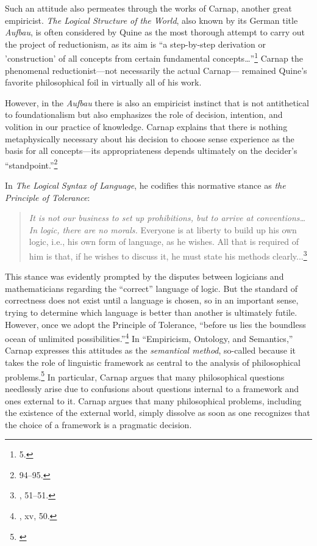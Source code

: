 Such an attitude also permeates through the works of Carnap, another
great empiricist. \emph{The Logical Structure of the World}, also known
by its German title \emph{Aufbau}, is often considered by Quine as the
most thorough attempt to carry out the project of reductionism, as its
aim is ``a step-by-step derivation or 'construction' of all concepts
from certain fundamental concepts\ldots{}''\footnote{\cite{aufbau} 5.}
Carnap the phenomenal reductionist---not necessarily the actual Carnap--- remained Quine's favorite philosophical
foil in virtually all of his work.

However, in the \emph{Aufbau} there is also an empiricist instinct that
is not antithetical to foundationalism but also emphasizes the role of
decision, intention, and volition in our practice of knowledge. Carnap explains that there
is nothing metaphysically necessary about his decision to choose sense experience as the basis for all concepts---its
appropriateness depends ultimately on the decider's
``standpoint.''\footnote{\cite{aufbau} 94--95.}

In \emph{The Logical Syntax of Language}, he codifies this normative
stance as \emph{the Principle of Tolerance}:

\begin{quote}
\emph{It is not our business to set up prohibitions, but to arrive at conventions\ldots{} In logic, there are no morals.} Everyone is at liberty to build up his own logic, i.e., his own form of language, as he wishes. All that is required of him is that, if he wishes to discuss it, he must state his methods clearly...\footnote{\cite{logicalsyntax}, 51--51.}
\end{quote}

This stance was evidently prompted by the disputes between logicians and
mathematicians regarding the ``correct'' language of logic. But the
standard of correctness does not exist until a language is chosen, so in
an important sense, trying to determine which language is better than
another is ultimately futile. However, once we adopt the Principle of
Tolerance, ``before us lies the boundless ocean of unlimited
possibilities.''\footnote{\cite{logicalsyntax}, xv, 50.} In ``Empiricism, Ontology, and Semantics,'' Carnap expresses this attitudes as the \emph{semantical method}, so-called because it takes the role of linguistic framework as central to the analysis of philosophical problems.\footnote{\cite{carnapsemantic}} In particular, Carnap argues that many philosophical questions needlessly arise due to confusions about questions internal to a framework and ones external to it. Carnap argues that many philosophical problems, including the existence of the external world, simply dissolve as soon as one recognizes that the choice of a framework is a pragmatic decision.

